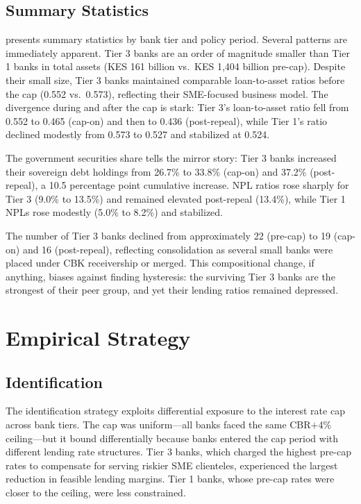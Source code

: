 \documentclass[12pt]{article}
\begin{document}
\subsection{Summary Statistics}

 presents summary statistics by bank tier and policy period. Several patterns are immediately apparent. Tier 3 banks are an order of magnitude smaller than Tier 1 banks in total assets (KES 161 billion vs.\ KES 1,404 billion pre-cap). Despite their small size, Tier 3 banks maintained comparable loan-to-asset ratios before the cap (0.552 vs.\ 0.573), reflecting their SME-focused business model. The divergence during and after the cap is stark: Tier 3's loan-to-asset ratio fell from 0.552 to 0.465 (cap-on) and then to 0.436 (post-repeal), while Tier 1's ratio declined modestly from 0.573 to 0.527 and stabilized at 0.524.

The government securities share tells the mirror story: Tier 3 banks increased their sovereign debt holdings from 26.7\% to 33.8\% (cap-on) and 37.2\% (post-repeal), a 10.5 percentage point cumulative increase. NPL ratios rose sharply for Tier 3 (9.0\% to 13.5\%) and remained elevated post-repeal (13.4\%), while Tier 1 NPLs rose modestly (5.0\% to 8.2\%) and stabilized.

The number of Tier 3 banks declined from approximately 22 (pre-cap) to 19 (cap-on) and 16 (post-repeal), reflecting consolidation as several small banks were placed under CBK receivership or merged. This compositional change, if anything, biases against finding hysteresis: the surviving Tier 3 banks are the strongest of their peer group, and yet their lending ratios remained depressed.




\section{Empirical Strategy}
\label{sec:strategy}

\subsection{Identification}

The identification strategy exploits differential exposure to the interest rate cap across bank tiers. The cap was uniform---all banks faced the same CBR$+$4\% ceiling---but it bound differentially because banks entered the cap period with different lending rate structures. Tier 3 banks, which charged the highest pre-cap rates to compensate for serving riskier SME clienteles, experienced the largest reduction in feasible lending margins. Tier 1 banks, whose pre-cap rates were closer to the ceiling, were less constrained.
\end{document}
